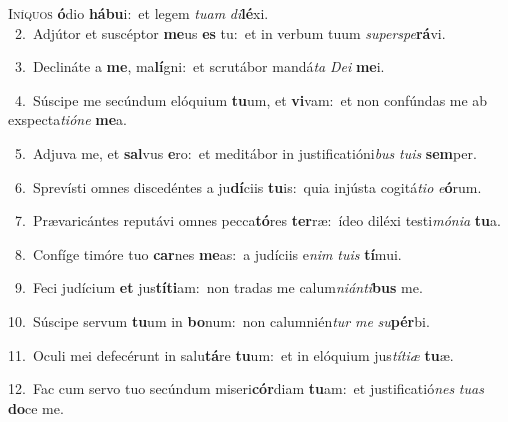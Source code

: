 \lettrine{\initial\textcolor{\initialcolor}{I}}{níquos} \textbf{ó}\-dio \textbf{há}\-\textbf{bu}i:~\star et legem \textit{tu}\-\textit{am} \textit{di}\-\textbf{lé}xi.\\
{\numbfont\textcolor{\numbcolor}{~2.}}~Adjútor et suscéptor \textbf{me}\-us \textbf{es} tu:~\star et in verbum tuum \textit{su}\-\textit{per}\textit{spe}\textbf{rá}vi.\par
{\numbfont\textcolor{\numbcolor}{~3.}}~Declináte a \textbf{me}\-, ma\-\textbf{lí}\-gni:~\star et scrutábor mandá\textit{ta} \textit{De}\-\textit{i} \textbf{me}\-i.\par
{\numbfont\textcolor{\numbcolor}{~4.}}~Súscipe me secúndum elóquium \textbf{tu}\-um, et \textbf{vi}\-vam:~\star et non confúndas me ab exspecta\-\textit{ti}\-\textit{ó}\textit{ne} \textbf{me}\-a.\par
{\numbfont\textcolor{\numbcolor}{~5.}}~Adjuva me, et \textbf{sal}\-vus \textbf{e}\-ro:~\star et meditábor in justificatióni\textit{bus} \textit{tu}\-\textit{is} \textbf{sem}\-per.\par
{\numbfont\textcolor{\numbcolor}{~6.}}~Sprevísti omnes discedéntes a ju\-\textbf{dí}\-ciis \textbf{tu}\-is:~\star quia injústa cogitá\-\textit{ti}\-\textit{o} \textit{e}\-\textbf{ó}rum.\par
{\numbfont\textcolor{\numbcolor}{~7.}}~Prævaricántes reputávi omnes pecca\-\textbf{tó}\-res \textbf{ter}\-ræ:~\star ídeo diléxi testi\-\textit{mó}\-\textit{ni}\textit{a} \textbf{tu}\-a.\par
{\numbfont\textcolor{\numbcolor}{~8.}}~Confíge timóre tuo \textbf{car}\-nes \textbf{me}\-as:~\star a judíciis e\textit{nim} \textit{tu}\-\textit{is} \textbf{tí}\-mui.\par
{\numbfont\textcolor{\numbcolor}{~9.}}~Feci judícium \textbf{et} jus\-\textbf{tí}\-\textbf{ti}am:~\star non tradas me calum\-\textit{ni}\-\textit{án}\textit{ti}\textbf{bus} me.\par
{\numbfont\textcolor{\numbcolor}{10.}}~Súscipe servum \textbf{tu}\-um in \textbf{bo}\-num:~\star non calumnién\textit{tur} \textit{me} \textit{su}\-\textbf{pér}bi.\par
{\numbfont\textcolor{\numbcolor}{11.}}~Oculi mei defecérunt in salu\-\textbf{tá}\-re \textbf{tu}\-um:~\star et in elóquium jus\-\textit{tí}\-\textit{ti}\textit{æ} \textbf{tu}\-æ.\par
{\numbfont\textcolor{\numbcolor}{12.}}~Fac cum servo tuo secúndum miseri\-\textbf{cór}\-diam \textbf{tu}\-am:~\star et justificatió\textit{nes} \textit{tu}\-\textit{as} \textbf{do}\-ce me.\par
